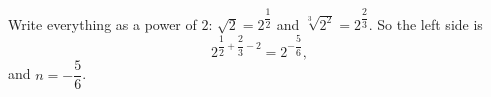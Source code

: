 Write everything as a power of $2$: $\sqrt2=2^{\dfrac12}$ and $\sqrt[3]{2^2}=2^{\dfrac23}$. So the left side is
\[2^{\dfrac12+\dfrac23-2}=2^{-\dfrac56},\]
and $n=\boxed{-\dfrac56}$.
